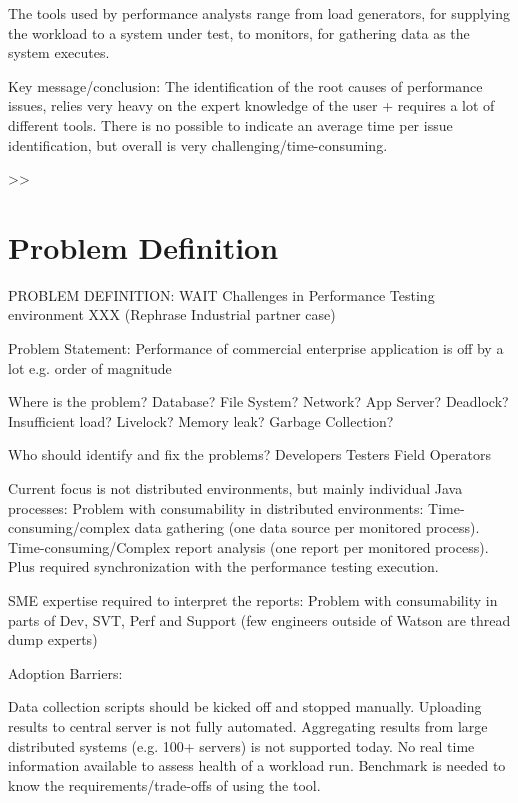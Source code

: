 \documentclass[runningheads,a4paper]{llncs}
\begin{document}
The tools used by performance analysts range from load generators, for supplying
the workload to a system under test, to monitors, for gathering data as the
system executes.

Key message/conclusion: The identification of the root causes of performance issues, relies very heavy on the expert knowledge of the user + requires a lot of different tools. There is no possible to indicate an average time per issue identification, but overall is very challenging/time-consuming.


>>


\section{Problem Definition}

PROBLEM DEFINITION: WAIT Challenges in Performance Testing environment 
XXX (Rephrase Industrial partner case)

Problem Statement: Performance of commercial enterprise application is off by a
lot e.g. order of magnitude

Where is the problem?
	Database? 	File System?
	Network?	App Server?
	Deadlock?	Insufficient load?
	Livelock?	Memory leak?
	Garbage Collection?

Who should identify and fix the problems?
	Developers
	Testers
	Field Operators

Current focus is not distributed environments, but mainly individual Java processes:
Problem with consumability in distributed environments:
Time-consuming/complex data gathering (one data source per monitored process).
Time-consuming/Complex report analysis (one report per monitored process).
Plus required synchronization with the performance testing execution.

SME expertise required to interpret the reports:
Problem with consumability in parts of Dev, SVT, Perf and Support (few engineers outside of Watson are thread dump experts)


Adoption Barriers: 

Data collection scripts should be kicked off and stopped manually.
Uploading results to central server is not fully automated.
Aggregating results from large distributed systems (e.g. 100+ servers) is not supported today.
No real time information available to assess health of a workload run.
Benchmark is needed to know the requirements/trade-offs of using the tool.
\end{document}
